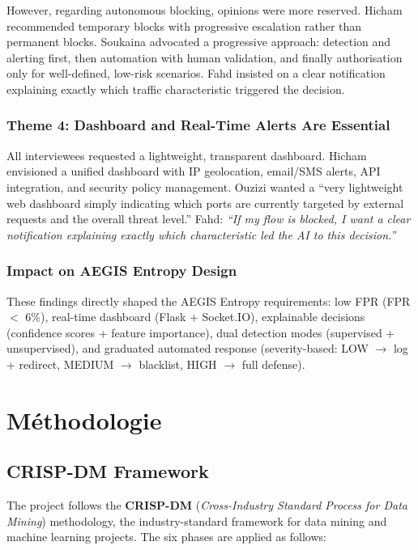 \documentclass[12pt,a4paper]{report}
\begin{document}
However, regarding autonomous blocking, opinions were more reserved. Hicham recommended temporary blocks with progressive escalation rather than permanent blocks. Soukaina advocated a progressive approach: detection and alerting first, then automation with human validation, and finally authorisation only for well-defined, low-risk scenarios. Fahd insisted on a clear notification explaining exactly which traffic characteristic triggered the decision.

\subsection{Theme 4: Dashboard and Real-Time Alerts Are Essential}

All interviewees requested a lightweight, transparent dashboard. Hicham envisioned a unified dashboard with IP geolocation, email/SMS alerts, API integration, and security policy management. Ouzizi wanted a ``very lightweight web dashboard simply indicating which ports are currently targeted by external requests and the overall threat level.'' Fahd: \textit{``If my flow is blocked, I want a clear notification explaining exactly which characteristic led the AI to this decision.''}

\subsection{Impact on AEGIS Entropy Design}

These findings directly shaped the AEGIS Entropy requirements: low FPR (FPR $<$ 6\%), real-time dashboard (Flask + Socket.IO), explainable decisions (confidence scores + feature importance), dual detection modes (supervised + unsupervised), and graduated automated response (severity-based: LOW $\to$ log + redirect, MEDIUM $\to$ blacklist, HIGH $\to$ full defense).

\chapter{Méthodologie}\label{ch:methodologie}

\section{CRISP-DM Framework}

The project follows the \textbf{CRISP-DM} (\textit{Cross-Industry Standard Process for Data Mining}) methodology, the industry-standard framework for data mining and machine learning projects. The six phases are applied as follows:
\end{document}
